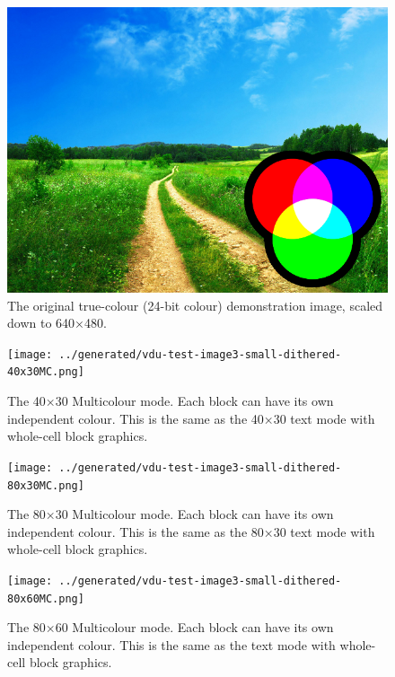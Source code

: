 \begin{figure}
  \centering
  \includegraphics[width=0.9\columnwidth]{figs/vdu-test-image3-original.png}%
  \caption[Original 640×480 demonstration image]
          {\label{fig:vdu:mode-original}The original true-colour (24-bit colour)
    demonstration image, scaled down to 640×480.
  }
\end{figure}

\begin{figure}[p]
  \centering
  \texttt{[image: ../generated/vdu-test-image3-small-dithered-40x30MC.png]}%
  \caption[40×30 Multicolour mode]
          {\label{fig:vdu:mode-40x30mc}The 40×30 Multicolour mode.
            Each block can have its own independent colour.
            This is the same as the 40×30 text mode with whole-cell block graphics.
  }
\end{figure}

\begin{figure}[p]
  \centering
  \texttt{[image: ../generated/vdu-test-image3-small-dithered-80x30MC.png]}%
  \caption[80×30 Multicolour mode]{\label{fig:vdu:mode-80x30mc}The 80×30 Multicolour mode.
    Each block can have its own independent colour.
    This is the same as the 80×30 text mode with whole-cell block graphics.
  }
\end{figure}


\begin{figure}[p]
  \centering
  \texttt{[image: ../generated/vdu-test-image3-small-dithered-80x60MC.png]}%
  \caption[80×60 Multicolour mode]{\label{fig:vdu:mode-80x60mc}The 80×60 Multicolour mode.
    Each block can have its own independent colour.
    This is the same as the text mode with whole-cell block graphics.
  }
\end{figure}

